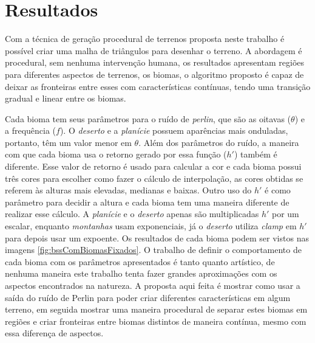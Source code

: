 \chapter{Resultados}
Com a técnica de geração procedural de terrenos proposta neste trabalho é possível criar uma 
malha de triângulos para desenhar o terreno. A abordagem é procedural, sem nenhuma 
intervenção humana, os resultados apresentam regiões para diferentes aspectos de terrenos,
os biomas, o algoritmo proposto é capaz de deixar as fronteiras entre esses com características 
contínuas, tendo uma transição gradual e linear entre os biomas.

Cada bioma tem seus parâmetros para o ruído de \textit{perlin}, que são as oitavas ($\theta$)
e a frequência ($f$). O \textit{deserto} e a \textit{planície} possuem aparências mais onduladas, portanto, têm
um valor menor em $\theta$. Além dos parâmetros do ruído, a maneira com que cada 
bioma usa o retorno gerado por essa função ($h'$) também é diferente. Esse valor de retorno
é usado para calcular a cor e cada bioma possui três cores para escolher como fazer o cálculo de interpolação, as cores obtidas se referem às alturas mais elevadas, medianas e baixas. Outro uso do $h'$
é como parâmetro para decidir a altura e cada bioma tem uma maneira diferente de realizar
esse cálculo. A \textit{planície} e o \textit{deserto} apenas são multiplicadas $h'$ por um escalar, enquanto
\textit{montanhas} usam exponenciais, já o \textit{deserto} utiliza \textit{clamp} em $h'$ para depois
usar um expoente. Os resultados de cada bioma podem ser vistos nas imagens \ref{fig:bssComBiomasFixados}.
O trabalho de definir o comportamento de cada bioma com os parâmetros apresentados 
é tanto quanto artístico, de nenhuma maneira este trabalho tenta fazer grandes aproximações
com os aspectos encontrados na natureza. A proposta aqui feita é mostrar como usar
a saída do ruído de Perlin para poder criar diferentes características em algum terreno, em 
seguida mostrar uma maneira procedural de separar estes biomas em regiões e criar fronteiras
entre biomas distintos de maneira contínua, mesmo com essa diferença de aspectos.


